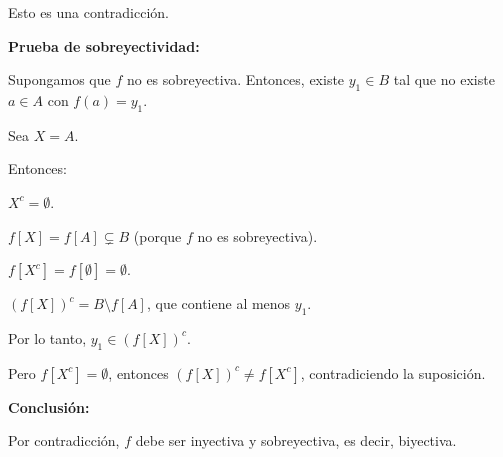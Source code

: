 \begin{solution}
\begin{enumerate}
      Esto es una contradicción.
    
    \textbf{Prueba de sobreyectividad:}
    
    Supongamos que \( f \) no es sobreyectiva. Entonces, existe \( y_1 \in B \) tal que no existe \( a \in A \) con \( f(a) = y_1 \).
    
    Sea \( X = A \).
    
    Entonces:
    
    \( X^c = \emptyset \).

    \( f[X] = f[A] \subsetneq B \) (porque \( f \) no es sobreyectiva).
    
    \( f[X^c] = f[\emptyset] = \emptyset \).
    
    \( (f[X])^c = B \setminus f[A] \), que contiene al menos \( y_1 \).
    
    Por lo tanto, \( y_1 \in (f[X])^c \).
    
    Pero \( f[X^c] = \emptyset \), entonces \( (f[X])^c \neq f[X^c] \), contradiciendo la suposición.
    
    \textbf{Conclusión:}
    
    Por contradicción, \( f \) debe ser inyectiva y sobreyectiva, es decir, biyectiva.
  \end{enumerate}
\end{solution}